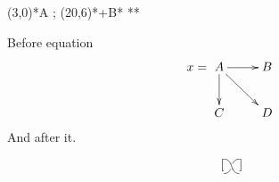 \documentclass{article}
\begin{document}
\xy (3,0)*{A} ; (20,6)*+{B}*\cir{} **\dir{-} \endxy


Before equation
\[ x = \xymatrix{A \ar[r] \ar[d] \ar[rd] & B \\ C & D} \]
And after it.

\[ [\raise5pt\xybox{0;/r1pc/:\htwist}] \]
\end{document}
